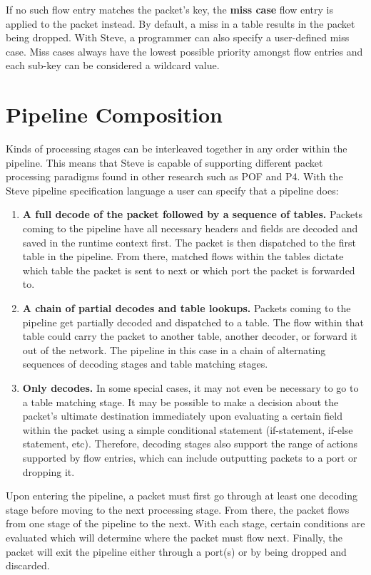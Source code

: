 If no such flow entry matches the packet's key, the \textbf{miss case} flow entry is applied to the packet instead. By default, a miss in a table results in the packet being dropped. With Steve, a programmer can also specify a user-defined miss case. Miss cases always have the lowest possible priority amongst flow entries and each sub-key can be considered a wildcard value.


\section{Pipeline Composition} \label{pipeline_comp_desc}

Kinds of processing stages can be interleaved together in any order within the pipeline. This means that Steve is capable of supporting different packet processing paradigms found in other research such as POF and P4. With the Steve pipeline specification language a user can specify that a pipeline does:

\begin{enumerate}
\item \textbf{A full decode of the packet followed by a sequence of tables.} Packets coming to the pipeline have all necessary headers and fields are decoded and saved in the runtime context first. The packet is then dispatched to the first table in the pipeline. From there, matched flows within the tables dictate which table the packet is sent to next or which port the packet is forwarded to.
\item \textbf{A chain of partial decodes and table lookups.} Packets coming to the pipeline get partially decoded and dispatched to a table. The flow within that table could carry the packet to another table, another decoder, or forward it out of the network. The pipeline in this case in a chain of alternating sequences of decoding stages and table matching stages.
\item \textbf{Only decodes.} In some special cases, it may not even be necessary to go to a table matching stage. It may be possible to make a decision about the packet’s ultimate destination immediately upon evaluating a certain field within the packet using a simple conditional statement (if-statement, if-else statement, etc). Therefore, decoding stages also support the range of actions supported by flow entries, which can include outputting packets to a port or dropping it.
\end{enumerate}

Upon entering the pipeline, a packet must first go through at least one decoding stage before moving to the next processing stage. From there, the packet flows from one stage of the pipeline to the next. With each stage, certain conditions are evaluated which will determine where the packet must flow next. Finally, the packet will exit the pipeline either through a port(s) or by being dropped and discarded.

